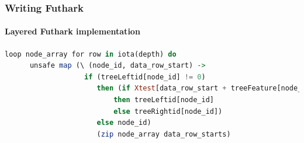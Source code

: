 \documentclass[12pt,t]{beamer}
\begin{document}
\begin{frame}[fragile]
  \frametitle{Writing Futhark}
  \framesubtitle{Layered Futhark implementation}
  \begin{minipage}{\textwidth}
  \begin{lstlisting}[basicstyle=\tiny, language=Haskell, breaklines]
  loop node_array for row in iota(depth) do
      unsafe map (\ (node_id, data_row_start) ->
                   if (treeLeftid[node_id] != 0)
                      then (if Xtest[data_row_start + treeFeature[node_id]] <= treeThres_or_leaf[node_id]
                          then treeLeftid[node_id]
                          else treeRightid[node_id])
                      else node_id)
                      (zip node_array data_row_starts)
  \end{lstlisting}
  \end{minipage}
%
%
%

\end{frame}
\end{document}
